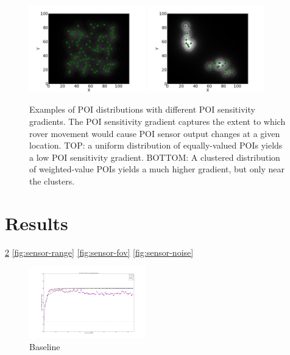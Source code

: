 \documentclass[letterpaper, 10 pt, conference]{ieeeconf}  %
\begin{document}
\begin{figure}[h!]
    \centering
    \includegraphics[width=0.45\textwidth]{sensitivity-spread-0.png}
    \includegraphics[width=0.45\textwidth]{sensitivity-clustered-1.png}
    \caption{Examples of POI distributions with different POI sensitivity gradients. The POI sensitivity gradient captures the extent to which rover movement would cause POI sensor output changes at a given location. TOP: a uniform distribution of equally-valued POIs yields a low POI sensitivity gradient. BOTTOM: A clustered distribution of weighted-value POIs yields a much higher gradient, but only near the clusters. }
    \label{fig:signal-contrast}
\end{figure}

\section{Results}
\ref{fig:baseline}
\ref{fig:sensor-range}
\ref{fig:sensor-fov}
\ref{fig:sensor-noise}

\begin{figure}[h!]
    \centering
    \includegraphics[width=0.45\textwidth]{SN0.png}
    \caption{Baseline}
    \label{fig:baseline}
\end{figure}
\end{document}

